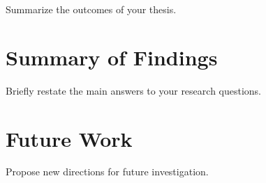 
Summarize the outcomes of your thesis.

\section{Summary of Findings}
Briefly restate the main answers to your research questions.

\section{Future Work}
Propose new directions for future investigation.